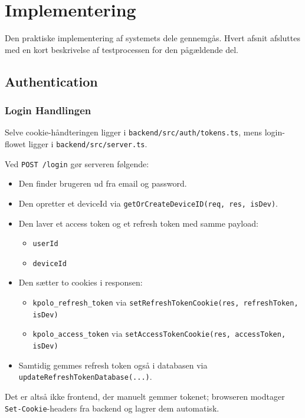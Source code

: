 \section{Implementering}
Den praktiske implementering af systemets dele gennemgås. Hvert afsnit afsluttes med en kort beskrivelse af testprocessen for
den pågældende del.
\subsection{Authentication}

\subsubsection{Login Handlingen}
Selve cookie-håndteringen ligger i \texttt{backend/src/auth/tokens.ts}, mens login-flowet ligger i \texttt{backend/src/server.ts}.

Ved \texttt{POST /login} gør serveren følgende:
\begin{itemize}
    \item Den finder brugeren ud fra email og password.
    \item Den opretter et deviceId via \texttt{getOrCreateDeviceID(req, res, isDev)}.
    \item Den laver et access token og et refresh token med samme payload:
    \begin{itemize}
        \item \texttt{userId}
        \item \texttt{deviceId}
    \end{itemize}
    \item Den sætter to cookies i responsen:
    \begin{itemize}
        \item \texttt{kpolo\_refresh\_token} via \texttt{setRefreshTokenCookie(res, refreshToken, isDev)}
        \item \texttt{kpolo\_access\_token} via \texttt{setAccessTokenCookie(res, accessToken, isDev)}
    \end{itemize}
    \item Samtidig gemmes refresh token også i databasen via \texttt{updateRefreshTokenDatabase(...)}.
\end{itemize}
Det er altså ikke frontend, der manuelt gemmer tokenet; browseren modtager \texttt{Set-Cookie}-headers fra backend og lagrer dem automatisk.

